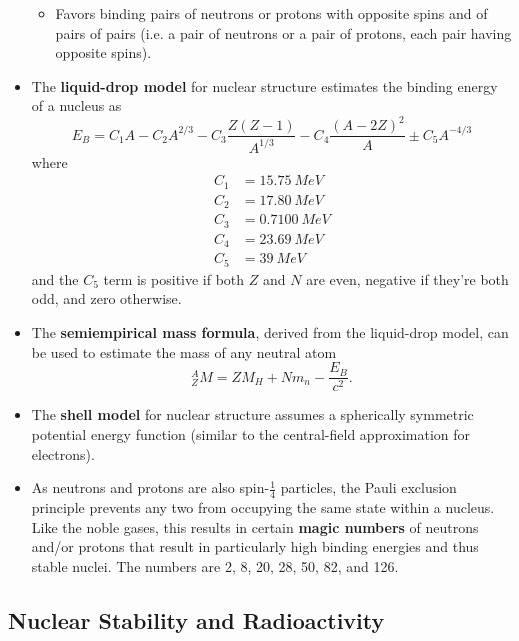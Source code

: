 \documentclass{article}
\begin{document}
\begin{itemize}
\begin{itemize}
          \item Favors binding pairs of neutrons or protons with opposite spins and of pairs of pairs (i.e. a pair of neutrons or a pair of protons, each pair having opposite spins).
        \end{itemize}

  \item The \textbf{liquid-drop model} for nuclear structure estimates the binding energy of a nucleus as \[E_B = C_1 A - C_2 A^{2 / 3} - C_3 \frac{Z (Z - 1)}{A^{1 / 3}} - C_4 \frac{(A - 2 Z)^2}{A} \pm C_5 A^{-4 / 3}\] where \begin{align*}
          C_1 & = \qty{15.75}{MeV}  \\
          C_2 & = \qty{17.80}{MeV}  \\
          C_3 & = \qty{0.7100}{MeV} \\
          C_4 & = \qty{23.69}{MeV}  \\
          C_5 & = \qty{39}{MeV}
        \end{align*} and the $C_5$ term is positive if both $Z$ and $N$ are even, negative if they're both odd, and zero otherwise.

  \item The \textbf{semiempirical mass formula}, derived from the liquid-drop model, can be used to estimate the mass of any neutral atom \[^A_Z M = Z M_H + N m_n - \frac{E_B}{c^2}.\]

  \item The \textbf{shell model} for nuclear structure assumes a spherically symmetric potential energy function (similar to the central-field approximation for electrons).

  \item As neutrons and protons are also spin-$\frac{1}{4}$ particles, the Pauli exclusion principle prevents any two from occupying the same state within a nucleus. Like the noble gases, this results in certain \textbf{magic numbers} of neutrons and/or protons that result in particularly high binding energies and thus stable nuclei. The numbers are 2, 8, 20, 28, 50, 82, and 126.
\end{itemize}

\subsection{Nuclear Stability and Radioactivity}
\end{document}
